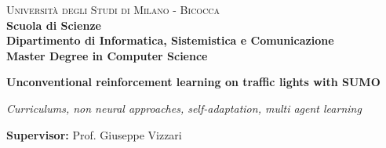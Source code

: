 \documentclass[a4paper,12pt,twoside]{book}
\begin{document}
    
    \begin{titlepage}
        
        \noindent
        \begin{minipage}[t]{0.19\textwidth}
        \end{minipage}
        \begin{minipage}[t]{0.81\textwidth}
        {
                {\textsc{Università degli Studi di Milano - Bicocca}} \\
                \textbf{Scuola di Scienze} \\
                \textbf{Dipartimento di Informatica, Sistemistica e Comunicazione} \\
                \textbf{Master Degree in Computer Science} \\
                \par
        }
        \end{minipage}
        
	\vspace{40mm}
        
	\begin{center}
            {\LARGE{
                    \textbf{Unconventional reinforcement learning on traffic lights with SUMO}
                    \par
            }}
            {\large{
                    \textit{Curriculums, non neural approaches, self-adaptation, multi agent learning}
                    \par
            }}
        \end{center}
        
        \vspace{50mm}

        \noindent
        {\large \textbf{Supervisor:} Prof. Giuseppe Vizzari}
        
        \vspace{15mm}


\end{titlepage}
\end{document}

